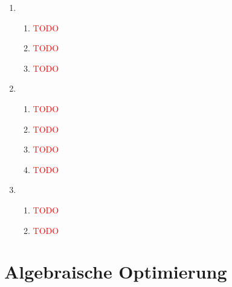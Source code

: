 \documentclass[ngerman]{gdb-aufgabenblatt}
\begin{document}
\begin{enumerate}
    \item 
        \begin{enumerate}
            \item 
                \textcolor{red}{TODO}
            \item 
                \textcolor{red}{TODO}
            \item 
                \textcolor{red}{TODO}
            
        \end{enumerate}
    \item 
        \begin{enumerate}
            \item 
                \textcolor{red}{TODO}
            \item
                \textcolor{red}{TODO}
            \item
                \textcolor{red}{TODO}
            \item
                \textcolor{red}{TODO}
                
        \end{enumerate}    

    \item 
        \begin{enumerate}
            \item 
                \textcolor{red}{TODO}
            \item
                \textcolor{red}{TODO}
                
        \end{enumerate}    

\end{enumerate}

\section{Algebraische Optimierung}
\end{document}

